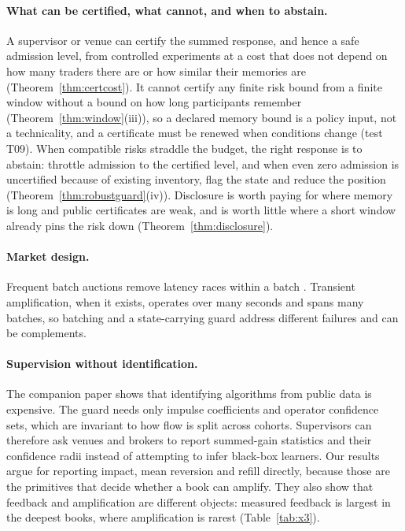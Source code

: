 \paragraph{What can be certified, what cannot, and when to abstain.} A supervisor or venue can certify the summed response, and hence a safe admission level, from controlled experiments at a cost that does not depend on how many traders there are or how similar their memories are (Theorem~\ref{thm:certcost}). It cannot certify any finite risk bound from a finite window without a bound on how long participants remember (Theorem~\ref{thm:window}(iii)), so a declared memory bound is a policy input, not a technicality, and a certificate must be renewed when conditions change (test T09). When compatible risks straddle the budget, the right response is to abstain: throttle admission to the certified level, and when even zero admission is uncertified because of existing inventory, flag the state and reduce the position (Theorem~\ref{thm:robustguard}(iv)). Disclosure is worth paying for where memory is long and public certificates are weak, and is worth little where a short window already pins the risk down (Theorem~\ref{thm:disclosure}).

\paragraph{Market design.} Frequent batch auctions remove latency races within a batch \citep{budish2015}. Transient amplification, when it exists, operates over many seconds and spans many batches, so batching and a state-carrying guard address different failures and can be complements.

\paragraph{Supervision without identification.} The companion paper shows that identifying algorithms from public data is expensive. The guard needs only impulse coefficients and operator confidence sets, which are invariant to how flow is split across cohorts. Supervisors can therefore ask venues and brokers to report summed-gain statistics and their confidence radii instead of attempting to infer black-box learners. Our results argue for reporting impact, mean reversion and refill directly, because those are the primitives that decide whether a book can amplify. They also show that feedback and amplification are different objects: measured feedback is largest in the deepest books, where amplification is rarest (Table~\ref{tab:x3}).

